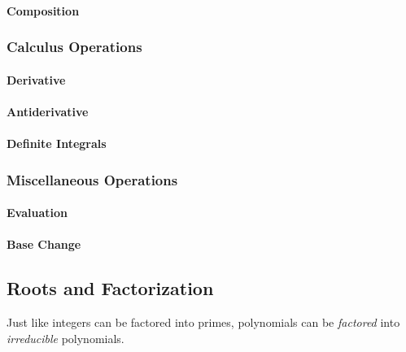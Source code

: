 


\paragraph{Composition}

\subsubsection{Calculus Operations}

\paragraph{Derivative}

\paragraph{Antiderivative}

\paragraph{Definite Integrals}


\subsubsection{Miscellaneous Operations}

\paragraph{Evaluation}

\paragraph{Base Change}



\subsection{Roots and Factorization}
Just like integers can be factored into primes, polynomials can be \emph{factored} into \emph{irreducible} polynomials.

